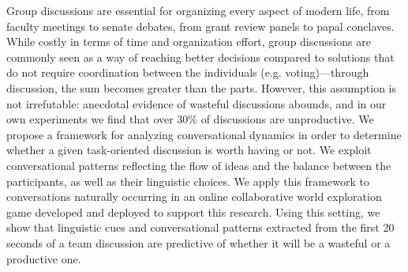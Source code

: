 Group discussions are essential for organizing every aspect of modern life, from faculty meetings to senate debates, from grant review panels to papal conclaves.  While costly in terms of time and organization effort, group discussions are commonly seen as a way of reaching better decisions compared to solutions that do not require coordination between the individuals (e.g. voting)---through discussion, the sum becomes greater than the parts.  However, this assumption is not irrefutable: anecdotal evidence of wasteful discussions abounds, and in our own experiments we find that over 30\% of discussions are unproductive. We propose a framework for analyzing conversational dynamics in order to determine whether a given task-oriented discussion is worth having or not.  We exploit conversational patterns reflecting the flow of ideas and the balance between the participants, as well as their linguistic choices. We apply this framework to conversations naturally occurring in an online collaborative world exploration game developed and deployed to support this research.  Using this setting, we show that linguistic cues and conversational patterns extracted from the first 20 seconds of a team discussion are predictive of whether it will be a wasteful or a productive one.
